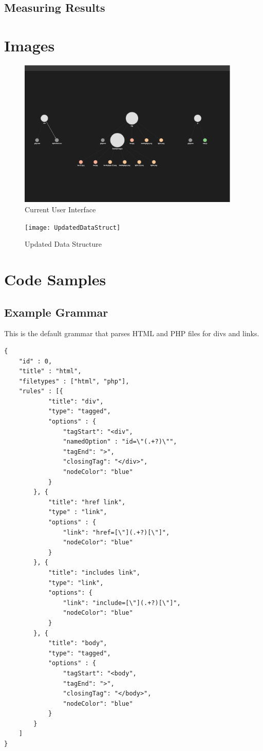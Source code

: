 \documentclass[letterpaper,10pt,titlepage,draftclsnofoot,onecolumn,onesided] {IEEEtran}
\begin{document}
	\subsection{Measuring Results}

\pagebreak	
\section{Images}
	\begin{figure}
		\includegraphics[width=400px]{capstoneUI1}
		\caption{Current User Interface}  %
	\end{figure}
	
	\begin{figure}
		\texttt{[image: UpdatedDataStruct]}
		\caption{Updated Data Structure}
	\end{figure}

\pagebreak
\section{Code Samples}
	\subsection{Example Grammar}
	This is the default grammar that parses HTML and PHP files for divs and links.
	
	\begin{lstlisting}
{
    "id" : 0,
    "title" : "html",
    "filetypes" : ["html", "php"],
    "rules" : [{
            "title": "div",
            "type": "tagged",
            "options" : {
                "tagStart": "<div",
                "namedOption" : "id=\"(.+?)\"",
                "tagEnd": ">",
                "closingTag": "</div>",
                "nodeColor": "blue"
            }
        }, {
            "title": "href link",
            "type" : "link",
            "options" : {
                "link": "href=[\"](.+?)[\"]",
                "nodeColor": "blue"
            }
        }, {
            "title": "includes link",
            "type": "link",
            "options": {
                "link": "include=[\"](.+?)[\"]",
                "nodeColor": "blue"
            }
        }, {
            "title": "body",
            "type": "tagged",
            "options" : {
                "tagStart": "<body",
                "tagEnd": ">",
                "closingTag": "</body>",
                "nodeColor": "blue"
            }
        }
    ]
}
	\end{lstlisting}
\end{document}
